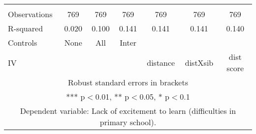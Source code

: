 \begin{tabular}{lcccccc}
 &  &  &  &  &  &  \\
Observations & 769 & 769 & 769 & 769 & 769 & 769 \\
R-squared & 0.020 & 0.100 & 0.141 & 0.141 & 0.141 & 0.140 \\
Controls & None & All & Inter &  &  &  \\
 IV &  &  &  & distance & distXsib & dist score \\ \hline
\multicolumn{7}{c}{ Robust standard errors in brackets} \\
\multicolumn{7}{c}{ *** p$<$0.01, ** p$<$0.05, * p$<$0.1} \\
\multicolumn{7}{c}{ Dependent variable: Lack of excitement to learn (difficulties in primary school).} \\
\end{tabular}
